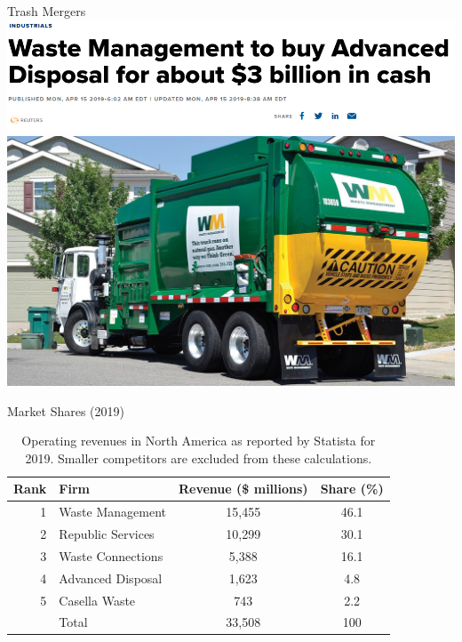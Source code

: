 \documentclass{beamer}
\begin{document}
\begin{frame}{Trash Mergers}
\centering
\includegraphics[width = \textwidth]{images/wmiannounce.png}
\includegraphics[width = \textwidth, height = .55\textheight]{images/wmtruck.png}
\end{frame}

\begin{frame}{Market Shares (2019)}
\begin{table}
\centering
 \begin{tabular}{r l c c}
Rank & Firm & Revenue (\$ millions) & Share (\%) \\ %
 \hline\hline
1 & Waste Management & 15,455 & 46.1 \\
2 & Republic Services & 10,299 &  30.1\\
3 & Waste Connections & 5,388 & 16.1\\
4 & Advanced Disposal & 1,623 & 4.8 \\
5 & Casella Waste & 743 & 2.2\\ \hline \hline 
& Total & 33,508 & 100
 \end{tabular}
\caption{Operating  revenues in North America as reported by Statista for 2019. Smaller competitors are excluded from these calculations.}
\end{table}
\end{frame}
\end{document}
